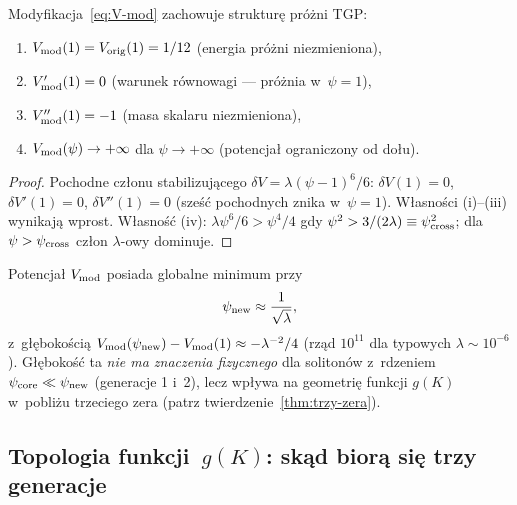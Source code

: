 \begin{proposition}%
\label{prop:proznia-zachowana}
Modyfikacja~\eqref{eq:V-mod} zachowuje strukturę próżni TGP:
\begin{enumerate}[nosep,label=(\roman*)]
    \item $V_{\rm mod}(1) = V_{\rm orig}(1) = 1/12$
          \quad (energia próżni niezmieniona),
    \item $V'_{\rm mod}(1) = 0$
          \quad (warunek równowagi — próżnia w~$\psi=1$),
    \item $V''_{\rm mod}(1) = -1$
          \quad (masa skalaru niezmieniona),
    \item $V_{\rm mod}(\psi) \to +\infty$ dla $\psi \to +\infty$
          \quad (potencjał ograniczony od dołu).
\end{enumerate}
\end{proposition}

\begin{proof}
Pochodne członu stabilizującego $\delta V = \lambda(\psi-1)^6/6$:
$\delta V(1) = 0$, $\delta V'(1) = 0$, $\delta V''(1) = 0$
(sześć pochodnych znika w~$\psi=1$). Własności (i)--(iii) wynikają
wprost. Własność (iv): $\lambda\psi^6/6 > \psi^4/4$ gdy
$\psi^2 > 3/(2\lambda) \equiv \psi_{\rm cross}^2$;
dla $\psi > \psi_{\rm cross}$ człon $\lambda$-owy dominuje.
\end{proof}

\begin{remark}%
\label{rem:nowe-minimum}
Potencjał $V_{\rm mod}$ posiada globalne minimum przy
\begin{equation}\label{eq:psi-new}
    \psi_{\rm new} \approx \frac{1}{\sqrt{\lambda}},
\end{equation}
z~głębokością $V_{\rm mod}(\psi_{\rm new}) - V_{\rm mod}(1) \approx -\lambda^{-2}/4$
(rząd $10^{11}$ dla typowych $\lambda \sim 10^{-6}$).
Głębokość ta \emph{nie ma znaczenia fizycznego} dla solitonów
z~rdzeniem $\psi_{\rm core} \ll \psi_{\rm new}$ (generacje 1 i~2),
lecz wpływa na geometrię funkcji $g(K)$ w~pobliżu trzeciego zera
(patrz twierdzenie~\ref{thm:trzy-zera}).
\end{remark}

\subsection{Topologia funkcji~$g(K)$: skąd biorą się trzy generacje}%
\label{app:I-topologia}

